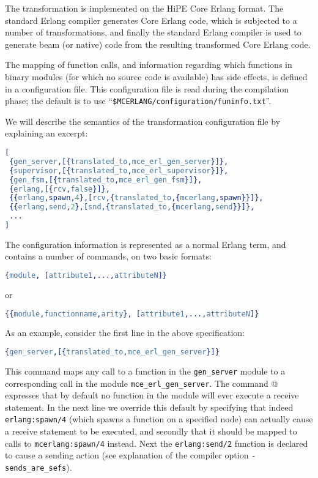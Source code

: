 \documentclass[a4paper]{article}
\begin{document}
The transformation is implemented on the HiPE Core Erlang format.
The standard Erlang compiler generates Core Erlang code, which
is subjected to a number of transformations, and finally
the standard Erlang compiler is used to generate beam (or native)
code from the resulting transformed Core Erlang code.

The mapping of function calls, and information regarding which
functions in binary modules (for which no source code is available)
has side effects, is defined in a configuration file.
This configuration file is read during the compilation phase;
the default is to use ``\texttt{\$MCERLANG/configuration/funinfo.txt}''.

We will describe the semantics of the transformation configuration 
file by explaining an excerpt:
\begin{lstlisting}[language=Erlang]
[
 {gen_server,[{translated_to,mce_erl_gen_server}]},
 {supervisor,[{translated_to,mce_erl_supervisor}]},
 {gen_fsm,[{translated_to,mce_erl_gen_fsm}]},
 {erlang,[{rcv,false}]},
 {{erlang,spawn,4},[rcv,{translated_to,{mcerlang,spawn}}]},
 {{erlang,send,2},[snd,{translated_to,{mcerlang,send}}]},
 ...
]
\end{lstlisting}
The configuration information is represented as a normal Erlang term,
and contains a number of commands, on two basic formats:
\begin{lstlisting}[language=Erlang]
{module, [attribute1,...,attributeN]}
\end{lstlisting}
or
\begin{lstlisting}[language=Erlang]
{{module,functionname,arity}, [attribute1,...,attributeN]}
\end{lstlisting}
As an example, consider the first line in the above specification:
\begin{lstlisting}[language=Erlang]
{gen_server,[{translated_to,mce_erl_gen_server}]}
\end{lstlisting}
This command maps any call to a function in the \lstinline{gen_server} module
to a corresponding call in the module \lstinline{mce_erl_gen_server}.
The command @ expresses that
by default no function in the \lstinline@erlang@ module will ever
execute a receive statement.
In the next line we override this default by specifying that
indeed \lstinline{erlang:spawn/4} (which spawns a function on a specified
node) can actually cause a receive statement to be executed, and secondly
that it should be mapped to calls to \lstinline{mcerlang:spawn/4} instead.
Next the \lstinline{erlang:send/2} function is declared to cause a sending
action (see explanation of the compiler option 
\lstinline{-sends_are_sefs}).
\end{document}
